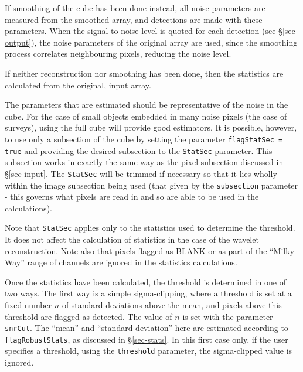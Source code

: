 If smoothing of the cube has been done instead, all noise parameters
are measured from the smoothed array, and detections are made with
these parameters. When the signal-to-noise level is quoted for each
detection (see \S\ref{sec-output}), the noise parameters of the
original array are used, since the smoothing process correlates
neighbouring pixels, reducing the noise level.

If neither reconstruction nor smoothing has been done, then the
statistics are calculated from the original, input array. 

The parameters that are estimated should be representative of the
noise in the cube. For the case of small objects embedded in many
noise pixels (\eg the case of \hi surveys), using the full cube will
provide good estimators. It is possible, however, to use only a
subsection of the cube by setting the parameter \texttt{flagStatSec =
  true} and providing the desired subsection to the \texttt{StatSec}
parameter. This subsection works in exactly the same way as the pixel
subsection discussed in \S\ref{sec-input}. The \texttt{StatSec} will
be trimmed if necessary so that it lies wholly within the image
subsection being used (\ie that given by the \texttt{subsection}
parameter - this governs what pixels are read in and so are able to be
used in the calculations).

Note that \texttt{StatSec} applies only to the statistics used to
determine the threshold. It does not affect the calculation of
statistics in the case of the wavelet reconstruction. Note also that
pixels flagged as BLANK or as part of the ``Milky Way'' range of
channels are ignored in the statistics calculations.


Once the statistics have been calculated, the threshold is determined
in one of two ways. The first way is a simple sigma-clipping, where a
threshold is set at a fixed number $n$ of standard deviations above
the mean, and pixels above this threshold are flagged as detected. The
value of $n$ is set with the parameter \texttt{snrCut}. The ``mean''
and ``standard deviation'' here are estimated according to
\texttt{flagRobustStats}, as discussed in \S\ref{sec-stats}. In this
first case only, if the user specifies a threshold, using the
\texttt{threshold} parameter, the sigma-clipped value is ignored.

